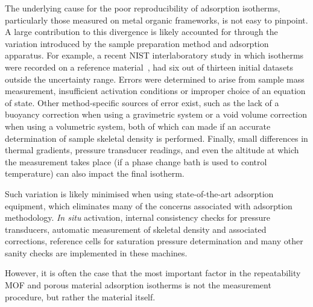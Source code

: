 The underlying cause for the poor reproducibility of adsorption
isotherms, particularly those measured on metal organic frameworks,
is not easy to pinpoint. A large contribution to this divergence
is likely accounted for through the variation introduced by the
sample preparation method and adsorption apparatus.
For example, a recent NIST interlaboratory study in which  
isotherms were recorded on a reference 
material~\cite{nguyenReferenceHighpressureCO22018}, had six 
out of thirteen initial datasets outside the uncertainty range.
Errors were determined to arise from sample mass measurement,
insufficient activation conditions or improper choice of an 
equation of state. Other method-specific sources of error exist,
such as the lack of a buoyancy correction when using a 
gravimetric system or a void volume correction when using 
a volumetric system, both of which can made if an accurate
determination of sample skeletal density is performed. Finally,
small differences in thermal gradients, pressure transducer
readings, and even the altitude at which the measurement takes place
(if a phase change bath is used to control temperature)
can also impact the final isotherm.

Such variation is likely minimised when using state-of-the-art 
adsorption equipment, which eliminates many of the concerns
associated with adsorption methodology. \textit{In situ}
activation, internal consistency checks for pressure transducers,
automatic measurement of skeletal density and associated 
corrections, reference cells for saturation pressure determination
and many other sanity checks are implemented in these machines.

However, it is often the case that the most important factor
in the repeatability MOF and porous material adsorption isotherms 
is not the measurement procedure, but rather the material itself.
